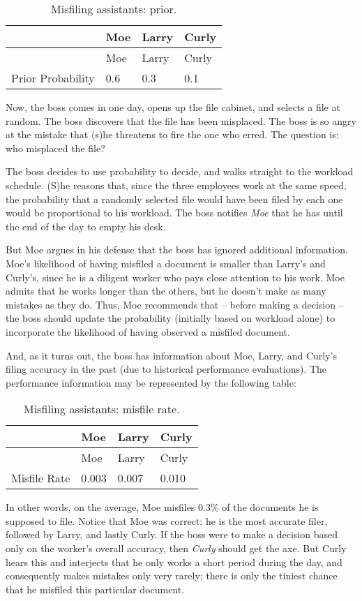\documentclass[]{book}
\numberwithin{equation}{chapter}
\numberwithin{figure}{chapter}
\theoremstyle{plain}
\theoremstyle{definition}
\theoremstyle{remark}
\theoremstyle{definition}
\theoremstyle{definition}
\theoremstyle{remark}
\begin{document}
\begin{longtable}[]{@{}llll@{}}
\caption{Misfiling assistants: prior.}\tabularnewline
\toprule
& Moe & Larry & Curly\tabularnewline
\midrule
\endfirsthead
\toprule
& Moe & Larry & Curly\tabularnewline
\midrule
\endhead
Prior Probability & 0.6 & 0.3 & 0.1\tabularnewline
\bottomrule
\end{longtable}

Now, the boss comes in one day, opens up the file cabinet, and selects a
file at random. The boss discovers that the file has been misplaced. The
boss is so angry at the mistake that (s)he threatens to fire the one who
erred. The question is: who misplaced the file?

The boss decides to use probability to decide, and walks straight to the
workload schedule. (S)he reasons that, since the three employees work at
the same speed, the probability that a randomly selected file would have
been filed by each one would be proportional to his workload. The boss
notifies \emph{Moe} that he has until the end of the day to empty his
desk.

But Moe argues in his defense that the boss has ignored additional
information. Moe's likelihood of having misfiled a document is smaller
than Larry's and Curly's, since he is a diligent worker who pays close
attention to his work. Moe admits that he works longer than the others,
but he doesn't make as many mistakes as they do. Thus, Moe recommends
that -- before making a decision -- the boss should update the
probability (initially based on workload alone) to incorporate the
likelihood of having observed a misfiled document.

And, as it turns out, the boss has information about Moe, Larry, and
Curly's filing accuracy in the past (due to historical performance
evaluations). The performance information may be represented by the
following table:

\begin{longtable}[]{@{}llll@{}}
\caption{Misfiling assistants: misfile rate.}\tabularnewline
\toprule
& Moe & Larry & Curly\tabularnewline
\midrule
\endfirsthead
\toprule
& Moe & Larry & Curly\tabularnewline
\midrule
\endhead
Misfile Rate & 0.003 & 0.007 & 0.010\tabularnewline
\bottomrule
\end{longtable}

In other words, on the average, Moe misfiles 0.3\% of the documents he
is supposed to file. Notice that Moe was correct: he is the most
accurate filer, followed by Larry, and lastly Curly. If the boss were to
make a decision based only on the worker's overall accuracy, then
\emph{Curly} should get the axe. But Curly hears this and interjects
that he only works a short period during the day, and consequently makes
mistakes only very rarely; there is only the tiniest chance that he
misfiled this particular document.
\end{document}
